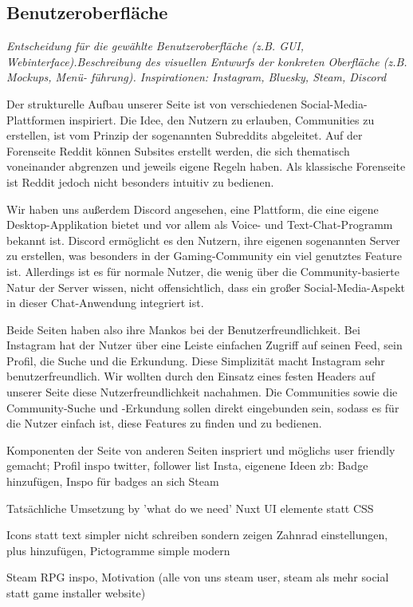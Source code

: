 \documentclass[a4paper,12pt]{article}
\begin{document}
\subsection{Benutzeroberfläche}
\textit{Entscheidung für die gewählte
Benutzeroberfläche (z.B. GUI, Webinterface).Beschreibung des visuellen Entwurfs der konkreten Oberfläche (z.B. Mockups,
Menü- führung). Inspirationen: Instagram, Bluesky, Steam, Discord}
 
Der strukturelle Aufbau unserer Seite ist von verschiedenen Social-Media-Plattformen inspiriert. Die Idee, den Nutzern zu erlauben, Communities zu erstellen, ist vom Prinzip der sogenannten Subreddits abgeleitet. Auf der Forenseite Reddit können Subsites erstellt werden, die sich thematisch voneinander abgrenzen und jeweils eigene Regeln haben. Als klassische Forenseite ist Reddit jedoch nicht besonders intuitiv zu bedienen.

Wir haben uns außerdem Discord angesehen, eine Plattform, die eine eigene Desktop-Applikation bietet und vor allem als Voice- und Text-Chat-Programm bekannt ist. Discord ermöglicht es den Nutzern, ihre eigenen sogenannten Server zu erstellen, was besonders in der Gaming-Community ein viel genutztes Feature ist. Allerdings ist es für normale Nutzer, die wenig über die Community-basierte Natur der Server wissen, nicht offensichtlich, dass ein großer Social-Media-Aspekt in dieser Chat-Anwendung integriert ist.

Beide Seiten haben also ihre Mankos bei der Benutzerfreundlichkeit. Bei Instagram hat der Nutzer über eine Leiste einfachen Zugriff auf seinen Feed, sein Profil, die Suche und die Erkundung. Diese Simplizität macht Instagram sehr benutzerfreundlich. Wir wollten durch den Einsatz eines festen Headers auf unserer Seite diese Nutzerfreundlichkeit nachahmen. Die Communities sowie die Community-Suche und -Erkundung sollen direkt eingebunden sein, sodass es für die Nutzer einfach ist, diese Features zu finden und zu bedienen. 

Komponenten der Seite von anderen Seiten inspriert und möglichs user friendly gemacht; Profil inspo twitter, follower list Insta, eigenene Ideen zb: Badge hinzufügen, Inspo für badges an sich Steam 

Tatsächliche Umsetzung by 'what do we need' Nuxt UI elemente statt CSS 

Icons statt text simpler nicht schreiben sondern zeigen Zahnrad einstellungen, plus hinzufügen, Pictogramme simple modern 

Steam RPG inspo, Motivation (alle von uns steam user, steam als mehr social statt game installer website) 
\end{document}
